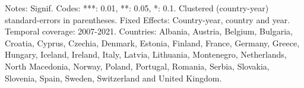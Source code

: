 \begin{table}[htbp]
   \par \raggedright 
   Notes: Signif. Codes: ***: 0.01, **: 0.05, *: 0.1. Clustered (country-year) standard-errors in parentheses. Fixed Effects: Country-year, country and year. Temporal coverage: 2007-2021. Countries: Albania, Austria, Belgium, Bulgaria, Croatia, Cyprus, Czechia, Denmark, Estonia, Finland, France, Germany, Greece, Hungary, Iceland, Ireland, Italy, Latvia, Lithuania, Montenegro, Netherlands, North Macedonia, Norway, Poland, Portugal, Romania, Serbia, Slovakia, Slovenia, Spain, Sweden, Switzerland and United Kingdom.
\end{table}


